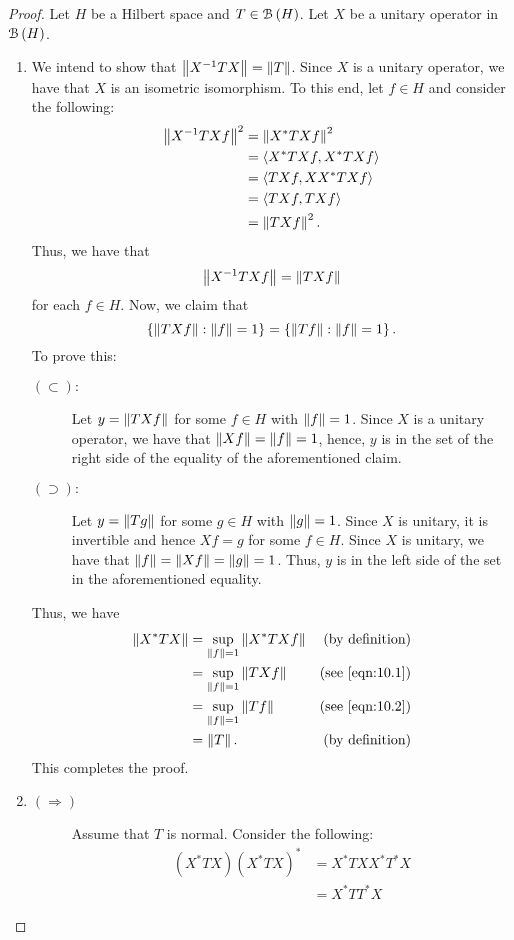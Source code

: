 \begin{proof}
    Let $H$ be a Hilbert space and $T \in {\cal B} \left( H \right)$. Let $X$ be a unitary operator in ${\cal B} \left( H \right)$. 

    \begin{enumerate}[label=(\roman*)]
	\item We intend to show that $\left\lVert X^{-1}TX \right\rVert=\left\lVert T \right\rVert$. Since $X$ is a unitary operator, we have that $X$ is an isometric isomorphism.
	    To this end, let $f\in H$ and consider the following:
	    \begin{align*}
		\left\lVert X^{-1}TXf \right\rVert^{2} &= \left\lVert X^{*}TXf \right\rVert^{2} \\
		&= \left\langle X^{*}TXf, X^{*}TXf \right\rangle \\
		&= \left\langle TXf, XX^{*}TXf \right\rangle \\
		&= \left\langle TXf, TXf \right\rangle \\
		&= \left\lVert TXf \right\rVert^{2}.
	    \end{align*}
	    Thus, we have that
	    \begin{equation}
		\left\lVert X^{-1}TXf \right\rVert = \left\lVert TXf \right\rVert
		\label{eqn:10.1}
	    \end{equation}
	    for each $f\in H$.
	    Now, we claim that
	    \begin{equation}
		\left\{ \left\lVert TXf \right\rVert : \left\lVert f \right\rVert=1 \right\} = \left\{ \left\lVert Tf \right\rVert : \left\lVert f \right\rVert=1 \right\}.
		\label{eqn:10.2}
	    \end{equation}
	    To prove this:
	    \begin{description}
		\item[$\left( \subset \right):$]  Let $y=\left\lVert TXf \right\rVert$ for some $f \in H$ with $\left\lVert f \right\rVert=1$. Since $X$ is a unitary operator, we have that $\left\lVert Xf \right\rVert=\left\lVert f \right\rVert=1$, hence, $y$ is in the set of the right side of the equality of the aforementioned claim.
		\item[$\left( \supset \right):$] Let $y=\left\lVert Tg \right\rVert$ for some $g\in H$ with $\left\lVert g \right\rVert=1$. Since $X$ is unitary, it is invertible and hence $Xf=g$ for some $f\in H$. Since $X$ is unitary, we have that $\left\lVert f \right\rVert=\left\lVert Xf \right\rVert=\left\lVert g \right\rVert=1$. Thus, $y$ is in the left side of the set in the aforementioned equality.
	    \end{description}
	    Thus, we have 
	    \begin{align*}
		\left\lVert X^{*}TX \right\rVert &= \sup_{\left\lVert f \right\rVert=1} \left\lVert X^{*}TXf \right\rVert & \text{(by definition)}\\
		&= \sup_{\left\lVert f \right\rVert=1} \left\lVert TXf \right\rVert & \text{(see \ref{eqn:10.1})}\\
		&= \sup_{\left\lVert f \right\rVert=1} \left\lVert Tf \right\rVert & \text{(see \ref{eqn:10.2})} \\
		&= \left\lVert T \right\rVert. & \text{(by definition)}
	    \end{align*}
	    This completes the proof.
	\item 
	    \begin{description}
		\item[$\left( \Longrightarrow \right)$] Assume that $T$ is normal. Consider the following:
		    \begin{align*}
			\left( X^{*}TX \right)\left( X^{*}TX \right)^{*} &=  X^{*}TXX^{*}T^{*}X \\
			&= X^{*}TT^{*}X
		    \end{align*}


\end{description}
\end{enumerate}
\end{proof}
